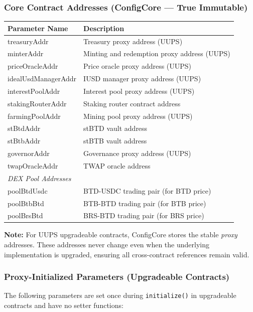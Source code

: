 \documentclass{article}
\begin{document}
\subsubsection{Core Contract Addresses (ConfigCore --- True Immutable)}

\begin{center}
\begin{longtable}{p{5cm}p{9cm}}
\toprule
Parameter Name & Description \\
\midrule
\endhead
treasuryAddr & Treasury proxy address (UUPS) \\
minterAddr & Minting and redemption proxy address (UUPS) \\
priceOracleAddr & Price oracle proxy address (UUPS) \\
idealUsdManagerAddr & IUSD manager proxy address (UUPS) \\
interestPoolAddr & Interest pool proxy address (UUPS) \\
stakingRouterAddr & Staking router contract address \\
farmingPoolAddr & Mining pool proxy address (UUPS) \\
stBtdAddr & stBTD vault address \\
stBtbAddr & stBTB vault address \\
governorAddr & Governance proxy address (UUPS) \\
twapOracleAddr & TWAP oracle address \\
\midrule
\multicolumn{2}{l}{\textit{DEX Pool Addresses}} \\
poolBtdUsdc & BTD-USDC trading pair (for BTD price) \\
poolBtbBtd & BTB-BTD trading pair (for BTB price) \\
poolBrsBtd & BRS-BTD trading pair (for BRS price) \\
\bottomrule
\end{longtable}
\end{center}

\textbf{Note:} For UUPS upgradeable contracts, ConfigCore stores the stable \textit{proxy} addresses. These addresses never change even when the underlying implementation is upgraded, ensuring all cross-contract references remain valid.

\subsubsection{Proxy-Initialized Parameters (Upgradeable Contracts)}

The following parameters are set once during \texttt{initialize()} in upgradeable contracts and have no setter functions:
\end{document}
